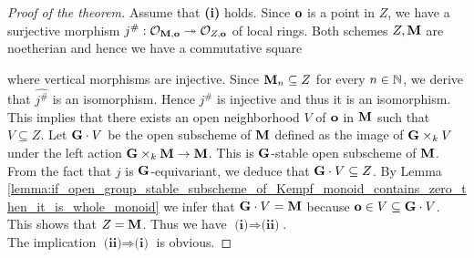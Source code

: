\begin{proof}[Proof of the theorem]
Assume that \textbf{(i)} holds. Since $\mathbf{o}$ is a point in $Z$, we have a surjective morphism $j^{\#}:{\mathcal O}_{\mathbf{M},\mathbf{o}}\twoheadrightarrow {\mathcal O}_{Z,\mathbf{o}}$ of local rings. Both schemes $Z,\mathbf{M}$ are noetherian and hence we have a commutative square
\begin{center}
\end{center}
where vertical morphisms are injective. Since $\mathbf{M}_n\subseteq Z$ for every $n\in {\mathbb N}$, we derive that $\widehat{j^{\#}}$ is an isomorphism. Hence $j^{\#}$ is injective and thus it is an isomorphism. This implies that there exists an open neighborhood $V$ of $\mathbf{o}$ in $\mathbf{M}$ such that $V\subseteq Z$. Let $\mathbf{G}\cdot V$ be the open subscheme of $\mathbf{M}$ defined as the image of $\mathbf{G}\times_kV$ under the left action $\mathbf{G}\times_k\mathbf{M}\rightarrow \mathbf{M}$. This is $\mathbf{G}$-stable open subscheme of $\mathbf{M}$. From the fact that $j$ is $\mathbf{G}$-equivariant, we deduce that $\mathbf{G}\cdot V\subseteq Z$. By Lemma \ref{lemma:if_open_group_stable_subscheme_of_Kempf_monoid_contains_zero_then_it_is_whole_monoid} we infer that $\mathbf{G}\cdot V = \mathbf{M}$ because $\mathbf{o}\in V\subseteq \mathbf{G}\cdot V$. This shows that $Z = \mathbf{M}$. Thus we have $\textbf{(i)}\Rightarrow \textbf{(ii)}$.\\
The implication $\textbf{(ii)}\Rightarrow \textbf{(i)}$ is obvious.
\end{proof}

































\small




